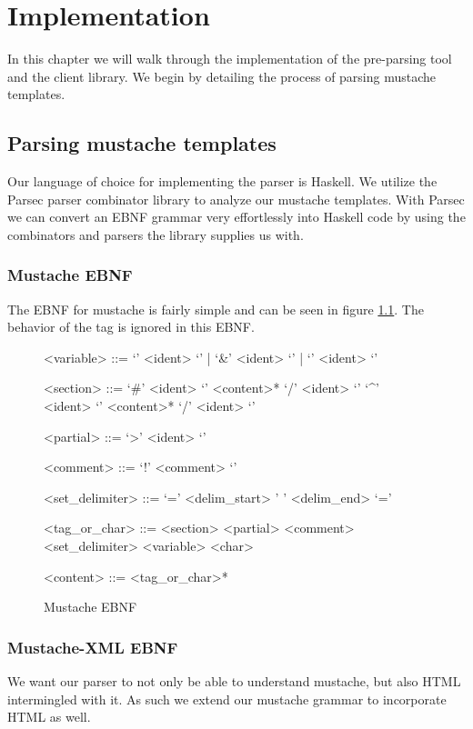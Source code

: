 \documentclass[thesis.tex]{subfiles}
\begin{document}
\chapter{Implementation}
\label{chap:impl}

In this chapter we will walk through the implementation of the pre-parsing tool
and the client library. We begin by detailing the process of parsing
mustache templates.

\section{Parsing mustache templates}
Our language of choice for implementing the parser is Haskell.
We utilize the Parsec parser combinator library to analyze our mustache
templates. With Parsec we can convert an EBNF grammar very effortlessly
into Haskell code by using the combinators and parsers the library supplies
us with.

\subsection{Mustache EBNF}
The EBNF for mustache is fairly simple and can be seen in figure
\ref{fig:mustache.ebnf}.
The behavior of the  tag is ignored in this EBNF.

\begin{figure}
	\centering
	\setlength{\grammarindent}{3.5cm}
	\begin{grammar}
<variable> ::= `{{{' <ident> `}}}' | `{{&' <ident> `}}' | `{{' <ident> `}}'

<section> ::= `{{#' <ident> `}}' <content>* `{{/' <ident> `}}'
         \alt `{{^' <ident> `}}' <content>* `{{/' <ident> `}}'

<partial> ::= `{{>' <ident> `}}'

<comment> ::= `{{!' <comment> `}}'

<set\_delimiter> ::= `{{=' <delim\_start>  ' ' <delim\_end> `=}}'

<tag\_or\_char> ::= <section>
               \alt <partial>
               \alt <comment>
               \alt <set\_delimiter>
               \alt <variable>
               \alt <char>

<content> ::= <tag\_or\_char>*
	\end{grammar}
	\caption{Mustache EBNF}
	\label{fig:mustache.ebnf}
\end{figure}

\subsection{Mustache-XML EBNF}
\label{sec:mustache-xml-ebnf}
We want our parser to not only be able to understand mustache, but also HTML
intermingled with it. As such we extend our mustache grammar to incorporate
HTML as well.
\end{document}

